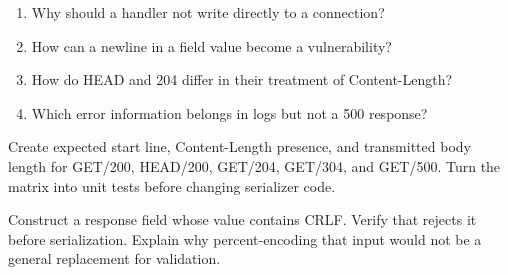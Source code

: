 \reviewtitle
\begin{enumerate}
  \item Why should a handler not write directly to a connection?
  \item How can a newline in a field value become a vulnerability?
  \item How do HEAD and 204 differ in their treatment of Content-Length?
  \item Which error information belongs in logs but not a 500 response?
\end{enumerate}

\begin{exercise}
Create expected start line, Content-Length presence, and transmitted body length
for GET/200, HEAD/200, GET/204, GET/304, and GET/500. Turn the matrix into unit
tests before changing serializer code.
\end{exercise}

\begin{exercise}
Construct a response field whose value contains CRLF. Verify that 
rejects it before serialization. Explain why percent-encoding that input would
not be a general replacement for validation.
\end{exercise}

